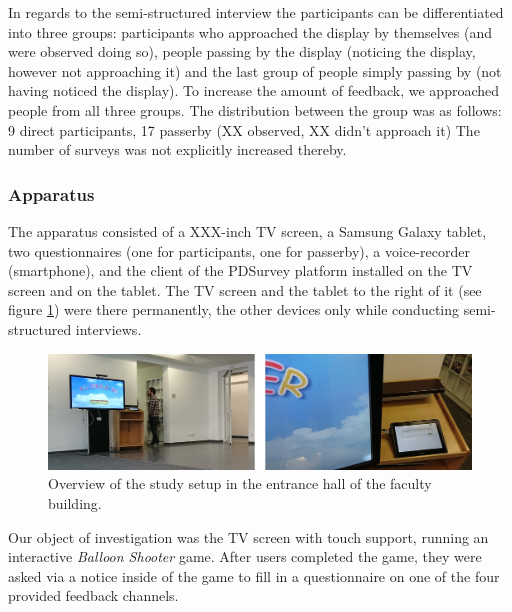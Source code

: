 
		In regards to the semi-structured interview the participants can be differentiated into three groups: participants who approached the display by themselves (and were observed doing so), people passing by the display (noticing the display, however not approaching it) and the last group of people simply passing by (not having noticed the display). To increase the amount of feedback, we approached people from all three groups. The distribution between the group was as follows: 9 direct participants, 17 passerby (XX observed, XX didn't approach it)
		The number of surveys was not explicitly increased thereby.




	\subsubsection{Apparatus}

		The apparatus consisted of a XXX-inch TV screen, a Samsung Galaxy tablet, two questionnaires (one for participants, one for passerby), a voice-recorder (smartphone), and the client of the PDSurvey platform installed on the TV screen and on the tablet. The TV screen and the tablet to the right of it (see figure \ref{fig:5-study-setup}) were there permanently, the other devices only while conducting semi-structured interviews.

		\begin{figure}
		    \begin{center}
		        \includegraphics[width=\columnwidth]{img/5_field-study/study-setup.jpg}
		    \end{center}
		 \caption{Overview of the study setup in the entrance hall of the faculty building.}
		 \label{fig:5-study-setup}
		\end{figure}

		Our object of investigation was the TV screen with touch support, running an interactive \textit{Balloon Shooter} game. After users completed the game, they were asked via a notice inside of the game to fill in a questionnaire on one of the four provided feedback channels. 
		

